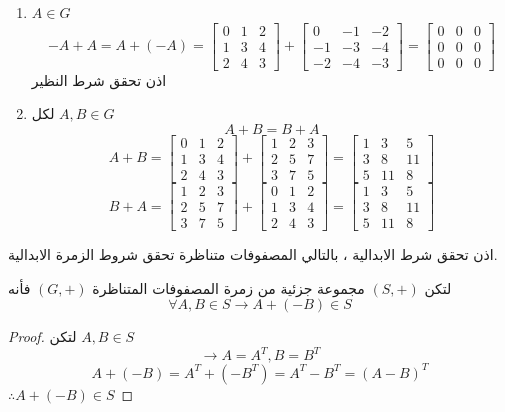 \begin{example}
\begin{enumerate}[label=\textbf{\xslalph*)}, leftmargin=*]
		\item $A\in G$
		\[
		-A + A = A + (-A) = 
		\begin{bmatrix}
			0&1&2\\
			1&3&4\\
			2&4&3
		\end{bmatrix} + 
		\begin{bmatrix}
			0&-1&-2\\
			-1&-3&-4\\
			-2&-4&-3
		\end{bmatrix} = 
		\begin{bmatrix}
			0&0&0\\
			0&0&0\\
			0&0&0
		\end{bmatrix}
		\]
		اذن تحقق شرط النظير
		\item لكل $A, B \in G$
		\[
		A+B = B+A
		\]
		\[
		A + B = 
		\begin{bmatrix}
			0&1&2\\
			1&3&4\\
			2&4&3
		\end{bmatrix} + 
		\begin{bmatrix}
			1&2&3\\
			2&5&7\\
			3&7&5
		\end{bmatrix}= 
		\begin{bmatrix}
			1&3&5\\
			3&8&11\\
			5&11&8
		\end{bmatrix}
		\]
		\[
		B+A = 
		\begin{bmatrix}
			1&2&3\\
			2&5&7\\
			3&7&5
		\end{bmatrix} +
		\begin{bmatrix}
			0&1&2\\
			1&3&4\\
			2&4&3
		\end{bmatrix}= 
		\begin{bmatrix}
			1&3&5\\
			3&8&11\\
			5&11&8
		\end{bmatrix}
		\]
		\end{enumerate}
		اذن تحقق شرط الابدالية ، بالتالي المصفوفات متناظرة تحقق شروط الزمرة الابدالية.
\end{example}


\newpage

\begin{theorem}
	لتكن $(S, +)$ مجموعة جزئية من زمرة المصفوفات المتناظرة $(G, +)$ فأنه
	\[
	\forall A, B\in S \to A + (-B) \in S
	\]
\end{theorem}
\begin{proof}
	لتكن $A, B\in S$
	\[
	\to A = A^T, B= B^T
	\]
	\[
	A + (- B) = A^T + (-B^T) = A^T - B^T = (A - B)^T
	\]
	$\therefore A + (-B) \in S$
\end{proof}

